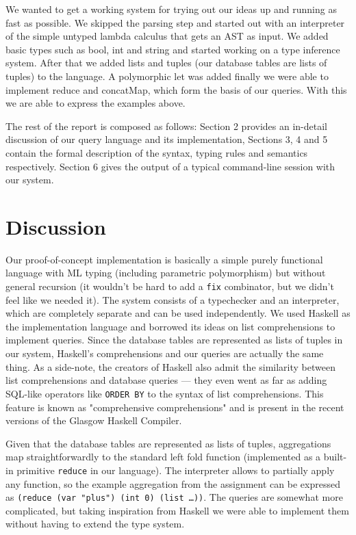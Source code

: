 \documentclass[10pt, oneside]{article}
\begin{document}
We wanted to get a working system for trying out our ideas up and running as fast as possible. We skipped the parsing step and started out with an interpreter of the simple untyped lambda calculus that gets an AST as input. We added basic types such as bool, int and string and started working on a type inference system. After that we added lists and tuples (our database tables are lists of tuples) to the language. A polymorphic let was added finally we were able to implement reduce and concatMap, which form the basis of our queries. With this we are able to express the examples above.

The rest of the report is composed as follows:
Section 2 provides an in-detail discussion of our query language and its implementation,
Sections 3, 4 and 5 contain the formal description of the syntax, typing rules and semantics respectively.
Section 6 gives the output of a typical command-line session with our system.

\section {Discussion}

Our proof-of-concept implementation is basically a simple purely functional
language with ML typing (including parametric polymorphism) but without general
recursion (it wouldn't be hard to add a \texttt{fix} combinator, but we didn't
feel like we needed it). The system consists of a typechecker and an
interpreter, which are completely separate and can be used independently. We
used Haskell as the implementation language and borrowed its ideas on list
comprehensions to implement queries. Since the database tables are represented
as lists of tuples in our system, Haskell's comprehensions and our queries are
actually the same thing. As a side-note, the creators of Haskell also admit the
similarity between list comprehensions and database queries --- they even went
as far as adding SQL-like operators like \texttt{ORDER BY} to the syntax of list
comprehensions.  This feature is known as "comprehensive comprehensions" and is
present in the recent versions of the Glasgow Haskell Compiler.

Given that the database tables are represented as lists of tuples, aggregations
map straightforwardly to the standard left fold function (implemented as a
built-in primitive \texttt{reduce} in our language). The interpreter allows to
partially apply any function, so the example aggregation from the assignment can
be expressed as \texttt{(reduce (var "plus") (int 0) (list \ldots))}. The
queries are somewhat more complicated, but taking inspiration from Haskell we
were able to implement them without having to extend the type system.
\end{document}
